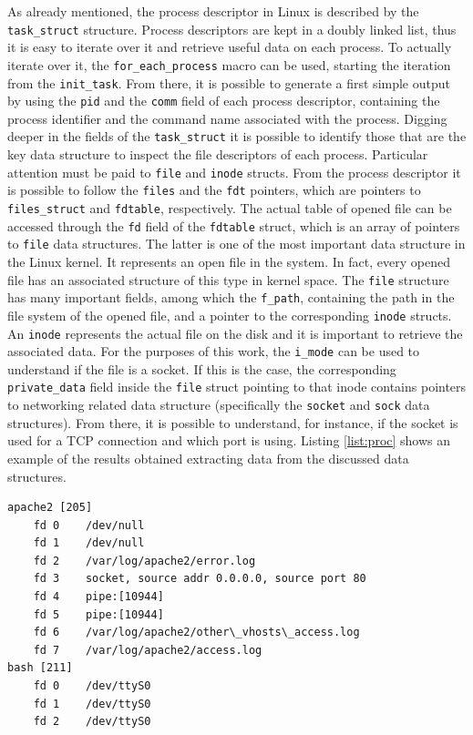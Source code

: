 As already mentioned, the process descriptor in Linux is described by the \texttt{task\_struct} structure. Process descriptors are kept in a doubly linked list, thus it is easy to iterate over it and retrieve useful data on each process. To actually iterate over it, the \texttt{for\_each\_process} macro can be used, starting the iteration from the \texttt{init\_task}. From there, it is possible to generate a first simple output by using the \texttt{pid} and the \texttt{comm} field of each process descriptor, containing the process identifier and the command name associated with the process. Digging deeper in the fields of the \texttt{task\_struct} it is possible to identify those that are the key data structure to inspect the file descriptors of each process. Particular attention must be paid to \texttt{file} and \texttt{inode} structs. From the process descriptor it is possible to follow the \texttt{files} and the \texttt{fdt} pointers, which are pointers to \texttt{files\_struct} and \texttt{fdtable}, respectively. The actual table of opened file can be accessed through the \texttt{fd} field of the \texttt{fdtable} struct, which is an array of pointers to \texttt{file} data structures. The latter is one of the most important data structure in the Linux kernel. It represents an open file in the system. In fact, every opened file has an associated structure of this type in kernel space. The \texttt{file} structure has many important fields, among which the \texttt{f\_path}, containing the path in the file system of the opened file, and a pointer to the corresponding \texttt{inode} structs. An \texttt{inode} represents the actual file on the disk and it is important to retrieve the associated data. For the purposes of this work, the \texttt{i\_mode} can be used to understand if the file is a socket. If this is the case, the corresponding \texttt{private\_data} field inside the \texttt{file} struct pointing to that inode contains pointers to networking related data structure (specifically the \texttt{socket} and \texttt{sock} data structures). From there, it is possible to understand, for instance, if the socket is used for a TCP connection and which port is using. Listing \ref{list:proc} shows an example of the results obtained extracting data from the discussed data structures.
\begin{lstlisting}[style=c, caption={Processes, files and networking listing}, label={list:proc}]
apache2 [205]
    fd 0	/dev/null
    fd 1	/dev/null
    fd 2	/var/log/apache2/error.log
    fd 3	socket, source addr 0.0.0.0, source port 80
    fd 4	pipe:[10944]
    fd 5	pipe:[10944]
    fd 6	/var/log/apache2/other\_vhosts\_access.log
    fd 7	/var/log/apache2/access.log
bash [211]
    fd 0	/dev/ttyS0
    fd 1	/dev/ttyS0
    fd 2	/dev/ttyS0
\end{lstlisting}
